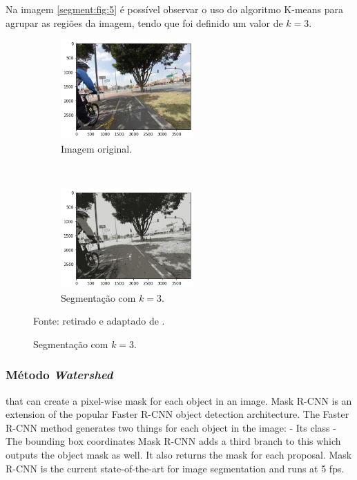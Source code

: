 Na imagem \ref{segment:fig:5} é possível observar o uso do algoritmo K-means para agrupar as regiões da imagem, tendo que foi definido um valor de $k = 3$.

\begin{figure}[H]
   \caption{Segmentação com K-means.}
   \centering
   \label{segment:fig:5}
    \begin{subfigure}[t]{0.45\textwidth}
        \centering
        \includegraphics[height=1.5in]{recursos/imagens/image_seg/i1.png}
        \caption{Imagem original.}
        \label{segment:fig:5.1}
    \end{subfigure}%
    ~ 
    \begin{subfigure}[t]{0.45\textwidth}
        \centering
        \includegraphics[height=1.5in]{recursos/imagens/image_seg/i2.png}
        \caption{Segmentação com $k = 3$.}
        \label{segment:fig:5.2}
    \end{subfigure}%

    \vspace*{1 cm}
    Fonte: retirado e adaptado de \cite{Neuhold2017_ICCV}.
\end{figure}


\subsubsection{Método \textit{Watershed}}

that can create a pixel-wise mask for each object in an image.
Mask R-CNN is an extension of the popular Faster R-CNN object detection architecture.
The Faster R-CNN method generates two things for each object in the image:
 - Its class
 - The bounding box coordinates
Mask R-CNN adds a third branch to this which outputs the object mask as well.
It also returns the mask for each proposal.
Mask R-CNN is the current state-of-the-art for image segmentation and runs at 5 fps.


